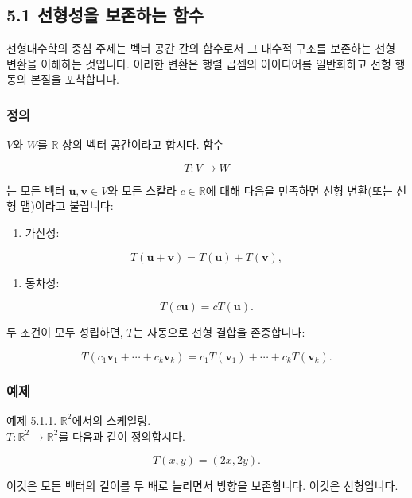 \documentclass[
  12pt,
  a4paper,
]{article}
\begin{document}
\subsection{5.1 선형성을 보존하는 함수}\label{51-functions-that-preserve-linearity}

선형대수학의 중심 주제는 벡터 공간 간의 함수로서 그 대수적 구조를 보존하는 선형 변환을 이해하는 것입니다. 이러한 변환은 행렬 곱셈의 아이디어를 일반화하고 선형 행동의 본질을 포착합니다.

\subsubsection{정의}\label{definition-3}

\(V\)와 \(W\)를 \(\mathbb{R}\) 상의 벡터 공간이라고 합시다. 함수

\[T : V \to W\]

는 모든 벡터 \(\mathbf{u}, \mathbf{v} \in V\)와 모든 스칼라 \(c \in \mathbb{R}\)에 대해 다음을 만족하면 선형 변환(또는 선형 맵)이라고 불립니다:

\begin{enumerate}
\def\labelenumi{\arabic{enumi}.}
\item
  가산성:
\end{enumerate}

\[T(\mathbf{u} + \mathbf{v}) = T(\mathbf{u}) + T(\mathbf{v}),\]

\begin{enumerate}
\def\labelenumi{\arabic{enumi}.}
\item
  동차성:
\end{enumerate}

\[T(c\mathbf{u}) = cT(\mathbf{u}).\]

두 조건이 모두 성립하면, \(T\)는 자동으로 선형 결합을 존중합니다:

\[T(c_1\mathbf{v}_1 + \cdots + c_k\mathbf{v}_k) = c_1 T(\mathbf{v}_1) + \cdots + c_k T(\mathbf{v}_k).\]

\subsubsection{예제}\label{examples-4}

예제 5.1.1. \(\mathbb{R}^2\)에서의 스케일링.\\
\(T:\mathbb{R}^2 \to \mathbb{R}^2\)를 다음과 같이 정의합시다.

\[T(x,y) = (2x, 2y).\]

이것은 모든 벡터의 길이를 두 배로 늘리면서 방향을 보존합니다. 이것은 선형입니다.
\end{document}
